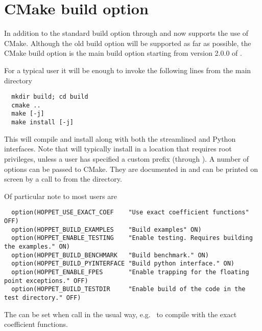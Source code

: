 \section{CMake build option}
\label{sec:cmake}
In addition to the standard build option through  and
 \hoppet now supports the use of CMake. Although
the old build option will be supported as far as possible, the CMake
build option is the main build option starting from version
2.0.0 of \hoppet.

For a typical user it will be enough to invoke the following lines
from the main directory
\begin{lstlisting}
  mkdir build; cd build
  cmake ..
  make [-j]
  make install [-j]
\end{lstlisting}
This will compile and install \hoppet along with both the streamlined
and Python interfaces. Note that  will typically
install in a location that requires root privileges, unless a user has
specified a custom prefix (through
). A number of options can
be passed to CMake. They are documented in
 and can be printed on screen
by a call to  from the  directory.

Of particular note to most users are
\begin{lstlisting}
  option(HOPPET_USE_EXACT_COEF    "Use exact coefficient functions"  OFF)
  option(HOPPET_BUILD_EXAMPLES    "Build examples" ON)
  option(HOPPET_ENABLE_TESTING    "Enable testing. Requires building the examples." ON)
  option(HOPPET_BUILD_BENCHMARK   "Build benchmark." ON)
  option(HOPPET_BUILD_PYINTERFACE "Build python interface." ON)
  option(HOPPET_ENABLE_FPES       "Enable trapping for the floating point exceptions." OFF)
  option(HOPPET_BUILD_TESTDIR     "Enable build of the code in the test directory." OFF)
\end{lstlisting}
The can be set when call  in the usual way,
e.g.\  to compile \hoppet
with the exact coefficient functions.

